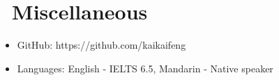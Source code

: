 \documentclass{resume}
\begin{document}
\section{\faInfo\ Miscellaneous}
\begin{itemize}[parsep=0.5ex]
  \item GitHub: https://github.com/kaikaifeng
  \item Languages: English - IELTS 6.5, Mandarin - Native speaker
\end{itemize}

%
%
\end{document}
